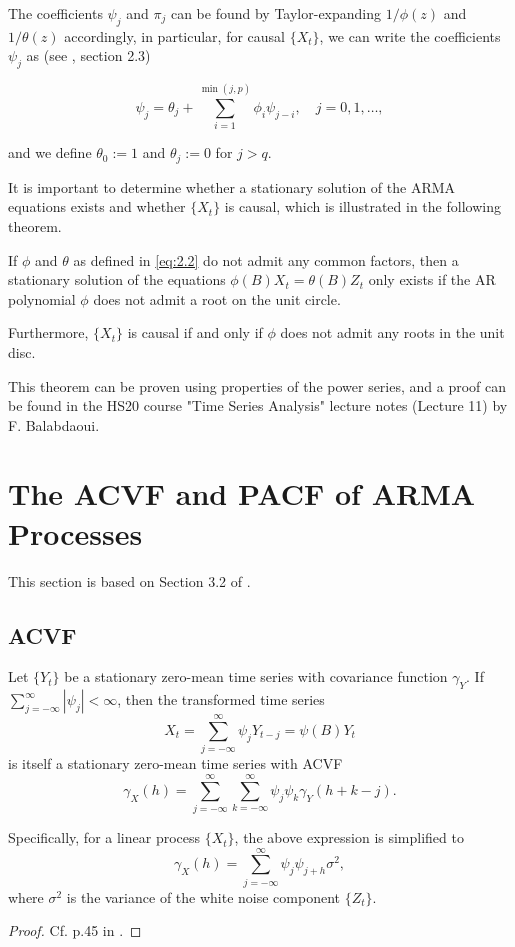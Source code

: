 \documentclass[a4paper, oneside]{discothesis}
\begin{document}
The coefficients $\psi_j$ and $\pi_j$ can be found by Taylor-expanding $1/\phi(z)$ and $1/\theta(z)$ accordingly, in particular, for causal $\{X_t\}$, we can write the coefficients $\psi_j$ as (see \cite{itsf}, section 2.3)

\begin{equation}\label{eq:causal_coeff}
    \psi_j = \theta_j + \sum_{i=1}^{\min(j,p)} \phi_i \psi_{j-i}, \quad j = 0, 1, \dots,
\end{equation}

and we define $\theta_0 := 1$ and $\theta_j := 0$ for $j > q$.

It is important to determine whether a stationary solution of the ARMA equations exists and whether $\{X_t\}$ is causal, which is illustrated in the following theorem.

\begin{theorem}
    If $\phi$ and $\theta$ as defined in \eqref{eq:2.2} do not admit any common factors, then a stationary solution of the equations $\phi(B) X_t = \theta(B) Z_t$ only exists if the AR polynomial $\phi$ does not admit a root on the unit circle.
    
    Furthermore, $\{X_t\}$ is causal if and only if $\phi$ does not admit any roots in the unit disc.
\end{theorem}
This theorem can be proven using properties of the power series, and a proof can be found in the HS20 course "Time Series Analysis" lecture notes (Lecture 11) by F. Balabdaoui.

\section{The ACVF and PACF of ARMA Processes}\label{sc:ACVFPACF}
This section is based on Section 3.2 of \cite{itsf}.
\subsection{ACVF}
\begin{proposition}
    Let $\{Y_t\}$ be a stationary zero-mean time series with covariance function $\gamma_Y$. If $\sum_{j=-\infty}^\infty |\psi_j| < \infty$, then the transformed time series
\begin{equation*}
    X_t = \sum_{j=-\infty}^\infty \psi_j Y_{t-j} = \psi(B) Y_t
\end{equation*}
is itself a stationary zero-mean time series with ACVF
\begin{equation*}
    \gamma_X(h) = \sum_{j=-\infty}^\infty \sum_{k=-\infty}^\infty \psi_j \psi_k \gamma_Y(h+k-j). 
\end{equation*}

Specifically, for a linear process $\{X_t\}$, the above expression is simplified to
\begin{equation} \label{eq:armaacvf}
    \gamma_X(h) = \sum_{j=-\infty}^\infty \psi_j \psi_{j+h} \sigma^2,
\end{equation}
where $\sigma^2$ is the variance of the white noise component $\{Z_t\}$.
\end{proposition}
\begin{proof}
    Cf. p.45 in \cite{itsf}.
\end{proof}
\end{document}
